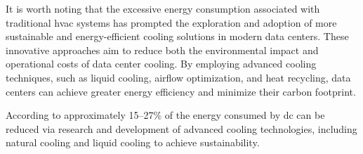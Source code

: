 \documentclass[
  a4paper,  %
  twoside,  %
  bibliography=totoc,
  headsepline,
  cleardoublepage=empty,
  parskip=half,
  draft=false
]{scrbook}
\begin{document}
It is worth noting that the excessive energy consumption associated with traditional \gls{hvac} systems has prompted the exploration and adoption of more sustainable and energy-efficient cooling solutions in modern data centers\cite{nadjahi2018review}. These innovative approaches aim to reduce both the environmental impact and operational costs of data center cooling. By employing advanced cooling techniques, such as liquid cooling, airflow optimization, and heat recycling, data centers can achieve greater energy efficiency and minimize their carbon footprint.

According to \cite{ZHU2023104322} approximately 15–27\% of the energy consumed by \gls{dc} can be reduced via research and development of advanced cooling technologies, including natural cooling and liquid cooling to achieve sustainability.
\end{document}
